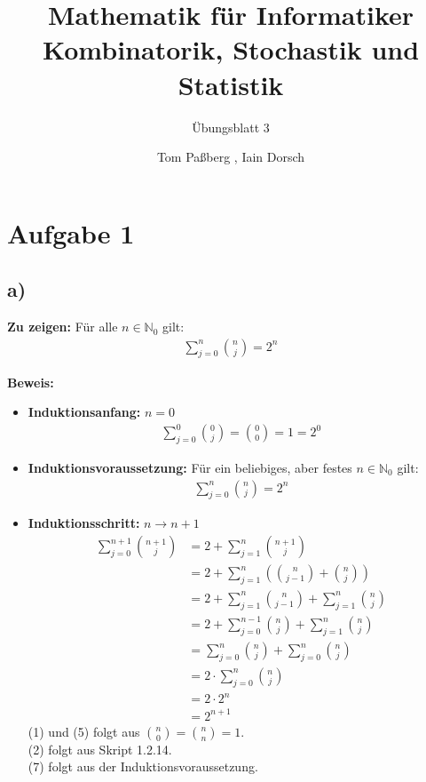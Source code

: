 \documentclass[a4paper]{scrartcl}
\title{Mathematik für Informatiker \\ Kombinatorik, Stochastik und Statistik}
\subtitle{Übungsblatt 3}
\author{Tom Paßberg , Iain Dorsch}
\date{}
\begin{document}
\maketitle

\newpage
\section*{Aufgabe 1}
\subsection*{a)}
\textbf{Zu zeigen:} Für alle $ n \in \mathbb{N}_0$ gilt: 
\begin{align*}
    \sum_{j=0}^{n} \binom{n}{j} = 2^n
\end{align*}

\textbf{Beweis:} 
\begin{itemize}
    \item \textbf{Induktionsanfang:} $n = 0$
    \begin{align*}
        \sum_{j=0}^{0} \binom{0}{j} = \binom{0}{0} = 1 = 2^0
    \end{align*}
    \item \textbf{Induktionsvoraussetzung:} Für ein beliebiges, aber festes $n \in \mathbb{N}_0$ gilt:
    \begin{align*}
        \sum_{j=0}^{n} \binom{n}{j} = 2^n
    \end{align*}
    \item \textbf{Induktionsschritt:} $n \to n+1$
    \begin{align}
        \sum_{j=0}^{n+1} \binom{n+1}{j} &= 2 + \sum_{j=1}^{n} \binom{n+1}{j} \\ 
        &= 2 + \sum_{j=1}^{n} \left( \binom{n}{j-1} + \binom{n}{j} \right) \\
        &= 2 + \sum_{j=1}^{n} \binom{n}{j-1} + \sum_{j=1}^{n}\binom{n}{j} \\
        &= 2 + \sum_{j=0}^{n-1} \binom{n}{j} + \sum_{j=1}^{n} \binom{n}{j} \\
        &= \sum_{j=0}^{n} \binom{n}{j} + \sum_{j=0}^{n} \binom{n}{j} \\
        &= 2 \cdot \sum_{j=0}^{n} \binom{n}{j} \\
        &= 2 \cdot 2^n \\[8px]
        &= 2^{n+1}
    \end{align}
    (1) und (5) folgt aus $ \binom{n}{0} = \binom{n}{n} = 1$. \\
    (2) folgt aus Skript 1.2.14. \\
    (7) folgt aus der Induktionsvoraussetzung. 
\end{itemize}
\end{document}
